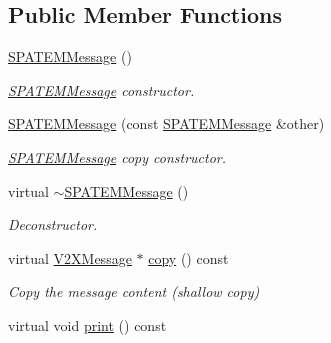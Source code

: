 \subsection*{Public Member Functions}
\begin{DoxyCompactItemize}
\item 
\hyperlink{classSPATEMMessage_abd0df1be48cb4a8b8f1d5b4e0c1e8822}{S\+P\+A\+T\+E\+M\+Message} ()\hypertarget{classSPATEMMessage_abd0df1be48cb4a8b8f1d5b4e0c1e8822}{}\label{classSPATEMMessage_abd0df1be48cb4a8b8f1d5b4e0c1e8822}

\begin{DoxyCompactList}\small\item\em \hyperlink{classSPATEMMessage}{S\+P\+A\+T\+E\+M\+Message} constructor. \end{DoxyCompactList}\item 
\hyperlink{classSPATEMMessage_a83b6ef70487b5fd5768291fdb8480e54}{S\+P\+A\+T\+E\+M\+Message} (const \hyperlink{classSPATEMMessage}{S\+P\+A\+T\+E\+M\+Message} \&other)
\begin{DoxyCompactList}\small\item\em \hyperlink{classSPATEMMessage}{S\+P\+A\+T\+E\+M\+Message} copy constructor. \end{DoxyCompactList}\item 
virtual \hyperlink{classSPATEMMessage_a6cb36864c94227303ba9a1dd760594f8}{$\sim$\+S\+P\+A\+T\+E\+M\+Message} ()\hypertarget{classSPATEMMessage_a6cb36864c94227303ba9a1dd760594f8}{}\label{classSPATEMMessage_a6cb36864c94227303ba9a1dd760594f8}

\begin{DoxyCompactList}\small\item\em Deconstructor. \end{DoxyCompactList}\item 
virtual \hyperlink{classV2XMessage}{V2\+X\+Message} $\ast$ \hyperlink{classSPATEMMessage_a082ffadf59589fe7a9c80573e948839d}{copy} () const 
\begin{DoxyCompactList}\small\item\em Copy the message content (shallow copy) \end{DoxyCompactList}\item 
virtual void \hyperlink{classSPATEMMessage_abd1a523ecdde1313c3cc4623abc0c3d9}{print} () const \hypertarget{classSPATEMMessage_abd1a523ecdde1313c3cc4623abc0c3d9}{}\label{classSPATEMMessage_abd1a523ecdde1313c3cc4623abc0c3d9}


\end{DoxyCompactItemize}
